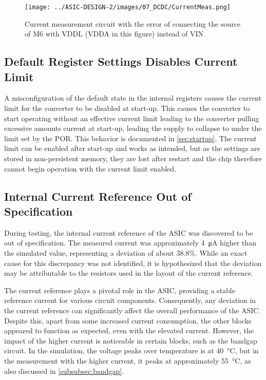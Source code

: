\begin{figure}[h]
    \centering
    \texttt{[image: ../ASIC-DESIGN-2/images/07\_DCDC/CurrentMeas.png]}
    \caption{Current measurement circuit with the error of connecting the source of M6 with VDDL (VDDA in this figure) instead of VIN}
    \label{fig:currentmeas}
\end{figure}


\subsection{Default Register Settings Disables Current Limit}
\label{sec:missingcurrentlimit}

A misconfiguration of the default state in the internal registers causes the current limit for the converter to be disabled at start-up. This causes the converter to start operating without an effective current limit leading to the converter pulling excessive amounts current at start-up, leading the supply to collapse to under the limit set by the \ac{POR}. This behavior is documented in \autoref{sec:startup}. The current limit can be enabled after start-up and works as intended, but as the settings are stored in non-persistent memory, they are lost after restart and the chip therefore cannot begin operation with the current limit enabled. 
\clearpage

\subsection{Internal Current Reference Out of Specification}
During testing, the internal current reference of the ASIC was discovered to be out of specification. The measured current was approximately \qty{4}{\micro\ampere} higher than the simulated value, representing a deviation of about 38.8\%. While an exact cause for this discrepancy was not identified, it is hypothesized that the deviation may be attributable to the resistors used in the layout of the current reference.

The current reference plays a pivotal role in the \ac{ASIC}, providing a stable reference current for various circuit components. Consequently, any deviation in the current reference can significantly affect the overall performance of the \ac{ASIC}. Despite this, apart from some increased current consumption, the other blocks appeared to function as expected, even with the elevated current. However, the impact of the higher current is noticeable in certain blocks, such as the bandgap circuit. In the simulation, the voltage peaks over temperature is at \qty{40}{\degreeCelsius}, but in the measurement with the higher current, it peaks at approximately \qty{55}{\degreeCelsius}, as also discussed in \autoref{subsubsec:bandgap}.

